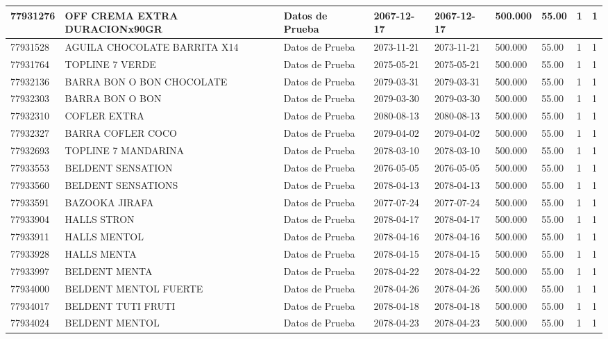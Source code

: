 \documentclass[a4paper,12pt]{article}
\begin{document}
\begin{landscape}
\begin{longtable}{|p{4cm}|p{2.5cm}|p{2.5cm}|p{1.8cm}|p{1.8cm}|p{1cm}|p{1cm}|p{3cm}|p{3cm}||}
77931276 & OFF CREMA EXTRA DURACIONx90GR & Datos de Prueba & 2067-12-17 & 2067-12-17 & 500.000 & 55.00 & 1 & 1 \\ \hline 
77931528 & AGUILA CHOCOLATE BARRITA X14 & Datos de Prueba & 2073-11-21 & 2073-11-21 & 500.000 & 55.00 & 1 & 1 \\ \hline 
77931764 & TOPLINE 7 VERDE & Datos de Prueba & 2075-05-21 & 2075-05-21 & 500.000 & 55.00 & 1 & 1 \\ \hline 
77932136 & BARRA BON O BON CHOCOLATE & Datos de Prueba & 2079-03-31 & 2079-03-31 & 500.000 & 55.00 & 1 & 1 \\ \hline 
77932303 & BARRA BON O BON & Datos de Prueba & 2079-03-30 & 2079-03-30 & 500.000 & 55.00 & 1 & 1 \\ \hline 
77932310 & COFLER EXTRA & Datos de Prueba & 2080-08-13 & 2080-08-13 & 500.000 & 55.00 & 1 & 1 \\ \hline 
77932327 & BARRA COFLER COCO & Datos de Prueba & 2079-04-02 & 2079-04-02 & 500.000 & 55.00 & 1 & 1 \\ \hline 
77932693 & TOPLINE 7 MANDARINA & Datos de Prueba & 2078-03-10 & 2078-03-10 & 500.000 & 55.00 & 1 & 1 \\ \hline 
77933553 & BELDENT SENSATION & Datos de Prueba & 2076-05-05 & 2076-05-05 & 500.000 & 55.00 & 1 & 1 \\ \hline 
77933560 & BELDENT SENSATIONS & Datos de Prueba & 2078-04-13 & 2078-04-13 & 500.000 & 55.00 & 1 & 1 \\ \hline 
77933591 & BAZOOKA JIRAFA & Datos de Prueba & 2077-07-24 & 2077-07-24 & 500.000 & 55.00 & 1 & 1 \\ \hline 
77933904 & HALLS STRON & Datos de Prueba & 2078-04-17 & 2078-04-17 & 500.000 & 55.00 & 1 & 1 \\ \hline 
77933911 & HALLS MENTOL & Datos de Prueba & 2078-04-16 & 2078-04-16 & 500.000 & 55.00 & 1 & 1 \\ \hline 
77933928 & HALLS MENTA & Datos de Prueba & 2078-04-15 & 2078-04-15 & 500.000 & 55.00 & 1 & 1 \\ \hline 
77933997 & BELDENT MENTA & Datos de Prueba & 2078-04-22 & 2078-04-22 & 500.000 & 55.00 & 1 & 1 \\ \hline 
77934000 & BELDENT MENTOL FUERTE & Datos de Prueba & 2078-04-26 & 2078-04-26 & 500.000 & 55.00 & 1 & 1 \\ \hline 
77934017 & BELDENT TUTI FRUTI & Datos de Prueba & 2078-04-18 & 2078-04-18 & 500.000 & 55.00 & 1 & 1 \\ \hline 
77934024 & BELDENT MENTOL & Datos de Prueba & 2078-04-23 & 2078-04-23 & 500.000 & 55.00 & 1 & 1 \\ \hline 

\end{longtable}
\end{landscape}
\end{document}
